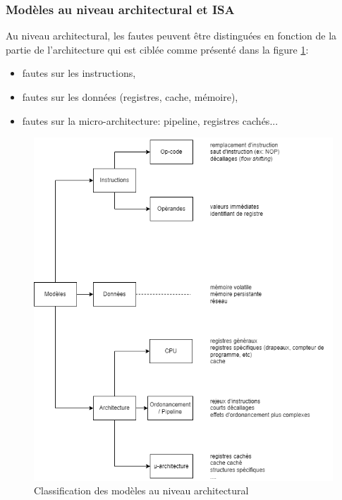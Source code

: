             \subsubsection{Modèles au niveau architectural et ISA}
            \label{sec:model:binary}
            
                Au niveau architectural, les fautes peuvent être distinguées en fonction de la partie de l'architecture qui est ciblée comme présenté dans la figure \ref{fig:arch-models-scheme}:
                \begin{itemize}
                    \item fautes sur les instructions,
                    \item fautes sur les données (registres, cache, mémoire),
                    \item fautes sur la micro-architecture: pipeline, registres cachés...
                \end{itemize}             
                
                \begin{figure}[ht]
                    \centering
                    \includegraphics[scale=.56]{ch2-background/img/Modeles Architecture fr.drawio.png}
                    \caption{Classification des modèles au niveau architectural}
                    \label{fig:arch-models-scheme}
                \end{figure}
                    
